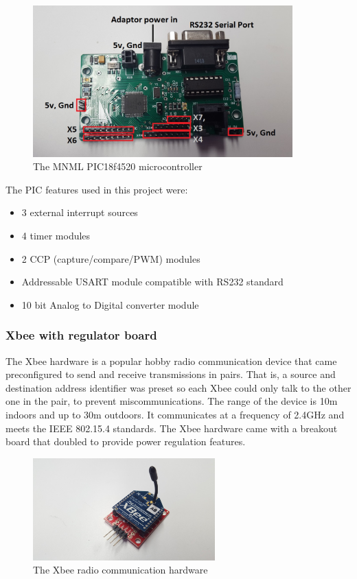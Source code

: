 \documentclass[11pt,a4paper]{article}
\begin{document}
    \begin{figure}[h]
        \includegraphics[width = 10cm]{pic.png}
        \caption{The MNML PIC18f4520 microcontroller}
    \end{figure}
    The PIC features used in this project were:
    \begin{itemize}
      \item 3 external interrupt sources
      \item 4 timer modules
      \item 2 CCP (capture/compare/PWM) modules
      \item Addressable USART module compatible with RS232 standard
      \item 10 bit Analog to Digital converter module
    \end{itemize}

    \subsubsection{Xbee with regulator board}
      The Xbee hardware is a popular hobby radio communication device that came preconfigured to send and receive transmissions in pairs. That is, a source and destination address identifier was preset so each Xbee could only talk to the other one in the pair, to prevent miscommunications. The range of the device is 10m indoors and up to 30m outdoors. It communicates at a frequency of 2.4GHz and meets the IEEE 802.15.4 standards. The Xbee hardware came with a breakout board that doubled to provide power regulation features.
      \begin{figure}[h]
          \includegraphics[width=7cm]{xbee.png}
          \caption{The Xbee radio communication hardware}
      \end{figure}
\end{document}
